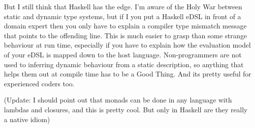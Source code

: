 \documentclass[proposal.tex]{subfiles}
\begin{document}
\begin{enumerate}
But I still think that Haskell has the edge. I'm aware of the Holy War between static and dynamic type systems, but if I you put a Haskell eDSL in front of a domain expert then you only have to explain a compiler type mismatch message that points to the offending line. This is much easier to grasp than some strange behaviour at run time, especially if you have to explain how the evaluation model of your eDSL is mapped down to the host language. Non-programmers are not used to inferring dynamic behaviour from a static description, so anything that helps them out at compile time has to be a Good Thing. And its pretty useful for experienced coders too.



(Update: I should point out that monads can be done in any language with lambdas and closures, and this is pretty cool. But only in Haskell are they really a native idiom)



\end{enumerate}
\end{document}
